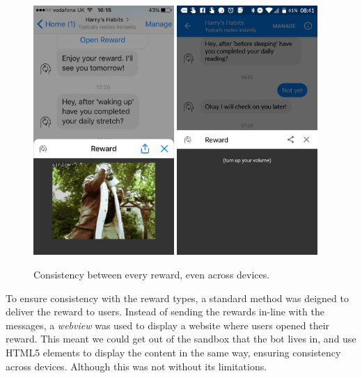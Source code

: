 \begin{figure}[H]
  \centering
  \includegraphics[width=2.1in]{../resources/design/reward-visual-2.png}
  \hspace{10px}
  \includegraphics[width=2.1in]{../resources/design/reward-audio.png}
  \caption{Consistency between every reward, even across devices.}
  \label{fig:rewards_consistency}
\end{figure}

To ensure consistency with the reward types, a standard method was deigned to deliver the reward to users.
Instead of sending the rewards in-line with the messages, a \textit{webview} was used to display a website where users opened their reward.
This meant we could get out of the sandbox that the bot lives in, and use HTML5 elements to display the content in the same way, ensuring consistency across devices.
Although this was not without its limitations.

